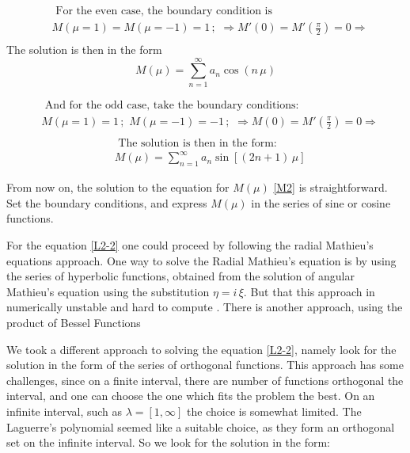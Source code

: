 \begin{equation}
\begin{split}
& \text{ For the even case, the boundary condition is } \\[.8em]
& M(\mu = 1) = M(\mu = -1) = 1\,;\,\,\Rightarrow  M'(0) = M'\left(\frac{\pi}{2}\right) = 0 \Rightarrow \\[.8em] 
\end{split}
\end{equation}
The solution is then in the form \\[.8em]
\begin{equation}\label{Meven}
M(\mu) = \sum_{n=1}^{\infty}{a_n \cos\left(n\,\mu\right)}
\end{equation}

\begin{equation}\label{Modd1}
\begin{split}
& \text{ And for the odd case, take the boundary conditions: } \\[.8em]
& M(\mu = 1) = 1\,;\,\,M(\mu = -1) = -1\,;\,\,\Rightarrow  M(0) = M'\left(\frac{\pi}{2}\right) = 0 \Rightarrow \\[.8em] 
\end{split}
\end{equation}
\begin{equation}\label{Modd2}
\begin{split}
& \text{ The solution is then in the form: } \\[.8em]
& M(\mu) = \sum_{n=1}^{\infty}{a_n \sin\left[\left(2n+1\right)\,\mu\right]} 
\end{split}
\end{equation}

From now on, the solution to the equation for $ M(\mu) $ \eqref{M2} is straightforward. Set the boundary conditions, and express  $ M(\mu) $ in the series of sine or cosine functions.

For the equation \eqref{L2-2} one could proceed by following the radial Mathieu's equations approach. One way to solve the Radial Mathieu's equation is by using the series of hyperbolic functions, obtained from the solution of angular Mathieu's equation using the substitution $ \eta = i\,\xi$.  But that this approach in numerically unstable and hard to compute \cite{Mathieu4}. There is another approach, using the product of Bessel Functions \cite{Mathieu4}

We took a different approach to solving the equation \eqref{L2-2}, namely look for the solution in the form of the series of orthogonal functions. This approach has some challenges, since on a finite interval, there are number of functions orthogonal the interval, and one can choose the one which fits the problem the best. On an infinite interval, such as $ \lambda = [1, \infty] $ the choice is somewhat limited. The Laguerre's polynomial seemed like a suitable choice, as they form an orthogonal set on the infinite interval. So we look for the solution in the form:

